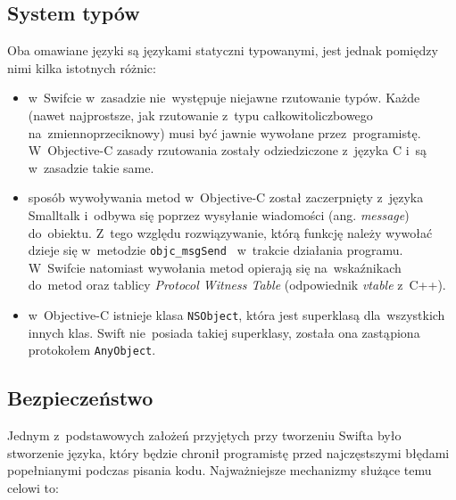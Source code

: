 \documentclass[mgr, shortabstract]{iithesis}
\newcommand{\ang}[1]{ang. \textit{#1}}
\begin{document}
\subsection{System typów}
\label{s:system_typow}

Oba omawiane języki są językami statyczni typowanymi, jest jednak pomiędzy nimi kilka istotnych różnic:

\begin{itemize}

    \item w~Swifcie w~zasadzie nie~występuje niejawne rzutowanie typów. Każde (nawet najprostsze, jak rzutowanie z~typu całkowitoliczbowego na~zmiennoprzeciknowy) musi być jawnie wywołane przez~programistę. W~Objective-C zasady rzutowania zostały odziedziczone z~języka C i~są w~zasadzie takie same.
    \item sposób wywoływania metod w~Objective-C został zaczerpnięty z~języka Smalltalk i~odbywa się poprzez wysyłanie wiadomości (\ang{message}) do~obiektu. Z~tego względu rozwiązywanie, którą funkcję należy wywołać dzieje się w~metodzie \texttt{objc_msgSend } w~trakcie działania programu. W~Swifcie natomiast wywołania metod opierają się na~wskaźnikach do~metod oraz tablicy \textit{Protocol Witness Table} (odpowiednik \textit{vtable} z~C++).
    \item w~Objective-C istnieje klasa \texttt{NSObject}, która jest superklasą dla~wszystkich innych klas. Swift nie~posiada takiej superklasy, została ona zastąpiona protokołem \texttt{AnyObject}.

\end{itemize}

\subsection{Bezpieczeństwo}

Jednym z~podstawowych założeń przyjętych przy tworzeniu Swifta było stworzenie języka, który będzie chronił programistę przed najczęstszymi błędami popełnianymi podczas pisania kodu. Najważniejsze mechanizmy służące temu celowi to:
\end{document}
